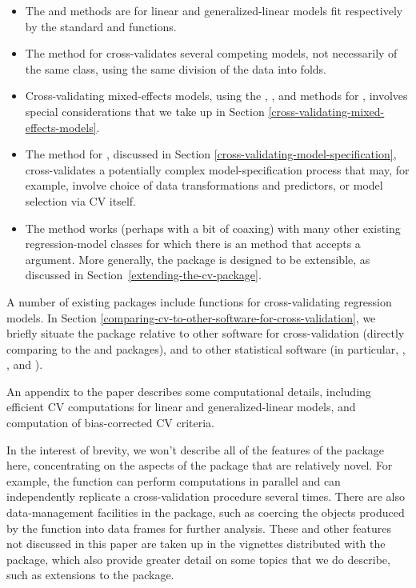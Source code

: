 \documentclass[
]{jss}
\begin{document}
\begin{itemize}
\item
  The  and  methods are for linear and
  generalized-linear models fit respectively by the standard
    and  functions.
\item
  The  method for  cross-validates several
  competing models, not necessarily of the same class, using the same
  division of the data into folds.
\item
  Cross-validating mixed-effects models, using the ,
  , and  methods for , involves
  special considerations that we take up in Section
  \ref{cross-validating-mixed-effects-models}.
\item
  The  method for , discussed in Section
  \ref{cross-validating-model-specification}, cross-validates a
  potentially complex model-specification process that may, for example,
  involve choice of data transformations and predictors, or model
  selection via CV itself.
\item
  The   method works (perhaps with a bit of
  coaxing) with many other existing regression-model classes for which
  there is an  method that accepts a 
  argument. More generally, the  package is designed to be
  extensible, as discussed in Section~\ref{extending-the-cv-package}.
\end{itemize}

A number of existing  packages include functions for
cross-validating regression models. In Section
\ref{comparing-cv-to-other-software-for-cross-validation}, we briefly
situate the  package relative to other  software for
cross-validation (directly comparing  to the  and
 packages), and to other statistical software (in particular,
, , and ).

An appendix to the paper describes some computational details, including
efficient CV computations for linear and generalized-linear models, and
computation of bias-corrected CV criteria.

In the interest of brevity, we won't describe all of the features of the
 package here, concentrating on the aspects of the package that
are relatively novel. For example, the  function can perform
computations in parallel and can independently replicate a
cross-validation procedure several times. There are also data-management
facilities in the package, such as coercing the objects produced by the
 function into data frames for further analysis. These and
other features not discussed in this paper are taken up in the vignettes
distributed with the package, which also provide greater detail on some
topics that we do describe, such as extensions to the package.
\end{document}
